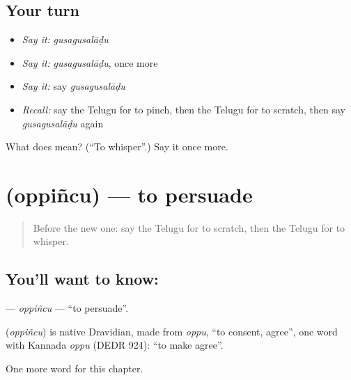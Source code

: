 \subsection*{Your turn}
\begin{itemize}
\raggedright
  \item \emph{Say it:} \emph{gusagusalāḍu}
  \item \emph{Say it:} \emph{gusagusalāḍu}, once more
  \item \emph{Say it:} say \emph{gusagusalāḍu}
  \item \emph{Recall:} say the Telugu for to pinch, then the Telugu for to scratch, then say \emph{gusagusalāḍu} again
\end{itemize}

\begin{tcolorbox}[breakable,colback=teal!4,colframe=teal!35!black,title={Before you move on}]
What does  mean? (\textquotedblleft{}To whisper\textquotedblright{}.) Say it once more.
\end{tcolorbox}
\section[\texorpdfstring{\te{ఒప్పించు} (oppiñcu)}{ఒప్పించు (oppiñcu)}]{ (oppiñcu) — to persuade}

\label{lesson:TE-C247-oppincu}



\begin{quote}
Before the new one: say the Telugu for to scratch, then the Telugu for to whisper.
\end{quote}

\subsection*{You'll want to know: }
\textbf{} — \emph{oppiñcu} — \textquotedblleft{}to persuade\textquotedblright{}.

\begin{cousinweb}
\textbf{} (\emph{oppiñcu}) is native Dravidian, made from \emph{oppu}, \textquotedblleft{}to consent, agree\textquotedblright{}, one word with Kannada \emph{oppu} (DEDR 924): \textquotedblleft{}to make agree\textquotedblright{}.
\end{cousinweb}

\begin{grammarlens}[title={What you've built}]
One more word for this chapter.
\end{grammarlens}

